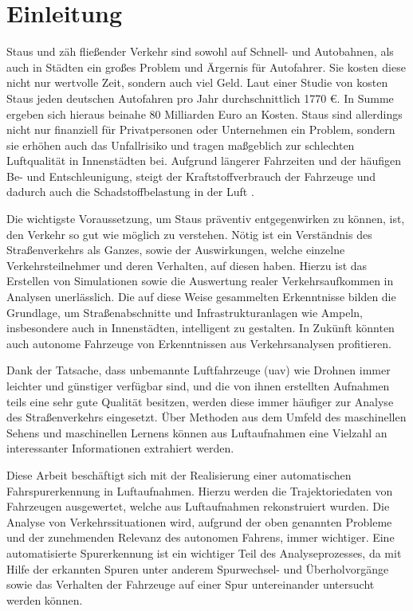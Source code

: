 
\chapter{Einleitung}
\label{cha:introduction}

Staus und zäh fließender Verkehr sind sowohl auf Schnell- und Autobahnen, als auch in Städten ein großes
Problem und Ärgernis für Autofahrer. Sie kosten diese nicht nur wertvolle Zeit, sondern auch viel Geld.
Laut einer Studie von \cite[]{Cookson} kosten Staus jeden deutschen Autofahren pro Jahr durchschnittlich 1770 €.
In Summe ergeben sich hieraus beinahe 80 Milliarden Euro an Kosten.
Staus sind allerdings nicht nur finanziell für Privatpersonen oder Unternehmen ein Problem,
sondern sie erhöhen auch das Unfallrisiko und tragen maßgeblich zur schlechten Luftqualität in Innenstädten bei.
Aufgrund längerer Fahrzeiten und der häufigen Be- und Entschleunigung, steigt der Kraftstoffverbrauch der
Fahrzeuge und dadurch auch die Schadstoffbelastung in der Luft \cite[]{Hemmerle2016}.

Die wichtigste Voraussetzung, um Staus präventiv entgegenwirken zu können, ist, den Verkehr so gut wie
möglich zu verstehen. Nötig ist ein Verständnis des Straßenverkehrs als Ganzes, sowie der Auswirkungen,
welche einzelne Verkehrsteilnehmer und deren Verhalten, auf diesen haben. Hierzu ist das Erstellen von
Simulationen sowie die Auswertung realer Verkehrsaufkommen in Analysen unerlässlich.
Die auf diese Weise gesammelten Erkenntnisse bilden die Grundlage, um Straßenabschnitte und Infrastrukturanlagen
wie Ampeln, insbesondere auch in Innenstädten, intelligent zu gestalten. In Zukünft könnten auch
autonome Fahrzeuge von Erkenntnissen aus Verkehrsanalysen profitieren.

Dank der Tatsache, dass unbemannte Luftfahrzeuge (\acrshort*{uav}) wie Drohnen immer leichter und günstiger
verfügbar sind, und die von ihnen erstellten Aufnahmen teils eine sehr gute Qualität besitzen, werden
diese immer häufiger zur Analyse des Straßenverkehrs eingesetzt. Über Methoden aus dem Umfeld des
maschinellen Sehens und maschinellen Lernens können aus Luftaufnahmen eine Vielzahl an interessanter
Informationen extrahiert werden.

Diese Arbeit beschäftigt sich mit der Realisierung einer automatischen Fahrspurerkennung in Luftaufnahmen.
Hierzu werden die Trajektoriedaten von Fahrzeugen ausgewertet, welche aus Luftaufnahmen rekonstruiert wurden.
Die Analyse von Verkehrssituationen wird, aufgrund der oben genannten Probleme und der zunehmenden Relevanz
des autonomen Fahrens, immer wichtiger.
Eine automatisierte Spurerkennung ist ein wichtiger Teil des Analyseprozesses, da mit Hilfe der
erkannten Spuren unter anderem Spurwechsel- und Überholvorgänge sowie das Verhalten der Fahrzeuge
auf einer Spur untereinander untersucht werden können.

